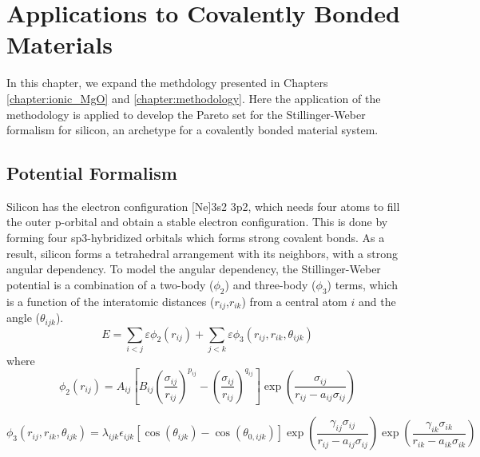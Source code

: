 \chapter{Applications to Covalently Bonded Materials}\label{chapter:pareto_Si}

In this chapter, we expand the methdology presented in Chapters \ref{chapter:ionic_MgO} and \ref{chapter:methodology}.  Here the application of the methodology is applied to develop the Pareto set for the Stillinger-Weber formalism\cite{stillinger1985_sw} for silicon, an archetype for a covalently bonded material system.

\section{Potential Formalism}
Silicon has the electron configuration [Ne]3s2 3p2, which needs four atoms to fill the outer p-orbital and obtain a stable electron configuration.  This is done by forming four sp3-hybridized orbitals which forms strong covalent bonds.  As a result, silicon forms a tetrahedral arrangement with its neighbors, with a strong angular dependency.  To model the angular dependency, the Stillinger-Weber potential\cite{stillinger1985_sw} is a combination of a two-body ($\phi_2$) and three-body ($\phi_3$) terms, which is a function of the interatomic distances ($r_{ij}$,$r_{ik}$) from a central atom $i$ and the angle ($\theta_{ijk}$).
\begin{equation}
    E = \sum_{i<j}\varepsilon \phi_2 (r_{ij})
        +\sum_{j<k}\varepsilon \phi_3 (r_{ij},r_{ik},\theta_{ijk})
\end{equation}
where
\begin{equation}
    \phi_2(r_{ij})=A_{ij} \left[
        B_{ij}
        \left(\frac{\sigma_{ij}}{r_{ij}}\right)^{p_{ij}}
        - \left(\frac{\sigma_{ij}}{r_{ij}}\right)^{q_{ij}}
    \right]
    \exp\left(\frac{\sigma_{ij}}{r_{ij}-a_{ij}\sigma_{ij}}\right)
\end{equation}

\begin{equation}
    \phi_3(r_{ij},r_{ik},\theta_{ijk}) =
        \lambda_{ijk}
        \epsilon_{ijk}
        \left[
            \cos(\theta_{ijk}) - \cos(\theta_{0,ijk})
        \right]
        \exp\left(\frac{\gamma_{ij}\sigma_{ij}}
                       {r_{ij}-a_{ij}\sigma_{ij}}
            \right)
        \exp\left(\frac{\gamma_{ik}\sigma_{ik}}
                       {r_{ik}-a_{ik}\sigma_{ik}}
            \right)
\end{equation}

